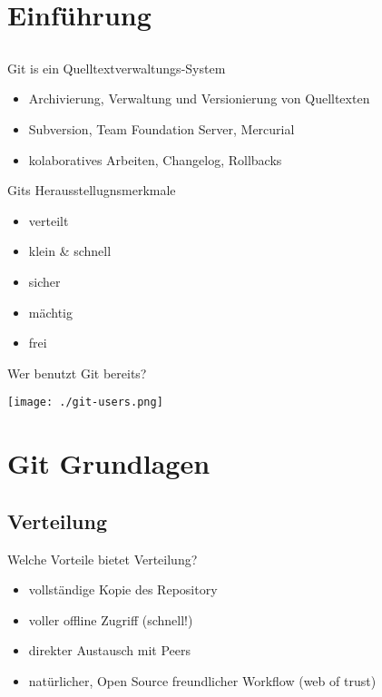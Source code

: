 

\frame{
    \titlepage
}

\section{Einführung}
\subsection{}

\begin{frame}{Git is ein Quelltextverwaltungs-System}
    \begin{itemize}[<+->]
        \item Archivierung, Verwaltung und Versionierung von Quelltexten
        \item Subversion, Team Foundation Server, Mercurial
        \item kolaboratives Arbeiten, Changelog, Rollbacks
    \end{itemize}
\end{frame}

\begin{frame}{Gits Herausstellugnsmerkmale}
    \begin{itemize}[<+->]
        \item \alert<6>{verteilt}
        \item klein \& schnell
        \item \alert<6>{sicher}
        \item \alert<6>{mächtig}
        \item frei
    \end{itemize}
\end{frame}

\begin{frame}{Wer benutzt Git bereits?}
    \centerline{\texttt{[image: ./git-users.png]}}
\end{frame}

\section{Git Grundlagen}

\subsection{Verteilung}

\begin{frame}{Welche Vorteile bietet Verteilung?}
    \begin{itemize}[<+->]
        \item vollständige Kopie des Repository
        \item voller offline Zugriff (schnell!)
        \item direkter Austausch mit Peers
        \item natürlicher, Open Source freundlicher Workflow (web of trust)
    \end{itemize}
\end{frame}


